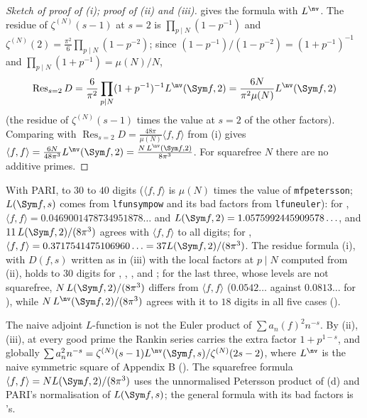 \begin{proof}[Sketch of proof of (i); proof of (ii) and (iii)]
gives the formula with $L^{\nv}$. The residue of $\zeta^{(N)}(s-1)$ at $s=2$ is $\prod_{p\mid N}(1-p^{-1})$ and
$\zeta^{(N)}(2)=\frac{\pi^2}6\prod_{p\mid N}(1-p^{-2})$; since $(1-p^{-1})/(1-p^{-2})=(1+p^{-1})^{-1}$ and $\prod_{p\mid N}(1+p^{-1})=\mu(N)/N$,
\[
\operatorname{Res}_{s=2}D=\frac6{\pi^2}\prod_{p\mid N}(1+p^{-1})^{-1}L^{\nv}(\Sym f,2)=\frac{6N}{\pi^2\mu(N)}L^{\nv}(\Sym f,2)
\]
(the residue of $\zeta^{(N)}(s-1)$ times the value at $s=2$ of the other factors). Comparing with $\operatorname{Res}_{s=2}D=\frac{48\pi}{\mu(N)}\langle f,f\rangle$ from (i)
gives $\langle f,f\rangle=\frac{6N}{48\pi^3}L^{\nv}(\Sym f,2)=\frac{N\,L^{\nv}(\Sym f,2)}{8\pi^3}$. For squarefree $N$ there are no additive primes.
\end{proof}

\begin{example}\label{ex:hecke:rankin-numerics}
With PARI, to $30$ to $40$ digits ($\langle f,f\rangle$ is $\mu(N)$ times the value of \texttt{mfpetersson}; $L(\Sym f,s)$ comes from \texttt{lfunsympow} and its bad factors from
\texttt{lfuneuler}): for ,
$\langle f,f\rangle=0.0469001478734951878\ldots$ and $L(\Sym f,2)=1.0575992445909578\ldots$, and $11\,L(\Sym f,2)/(8\pi^3)$ agrees with $\langle f,f\rangle$ to all digits; for ,
$\langle f,f\rangle=0.3717541475106960\ldots=37L(\Sym f,2)/(8\pi^3)$. The residue formula (i), with $D(f,s)$ written as in (iii) with the local factors at $p\mid N$ computed from (ii), holds to $30$
digits for , , ,  and ; for the last three, whose levels are not squarefree, $N\,L(\Sym f,2)/(8\pi^3)$ differs from $\langle f,f\rangle$
($0.0542\ldots$ against $0.0813\ldots$ for ), while $N\,L^{\nv}(\Sym f,2)/(8\pi^3)$ agrees with it to $18$ digits in all five cases ().
\end{example}

\begin{warning}\label{warn:hecke:rankin}
The naive adjoint $L$-function is not the Euler product of $\sum a_n(f)^2n^{-s}$. By (ii),(iii), at
every good prime the Rankin series carries the extra factor $1+p^{1-s}$, and globally $\sum a_n^2n^{-s}=\zeta^{(N)}(s-1)L^{\nv}(\Sym f,s)/\zeta^{(N)}(2s-2)$, where $L^{\nv}$ is the naive symmetric square of
Appendix B (). The squarefree formula $\langle f,f\rangle=NL(\Sym f,2)/(8\pi^3)$ uses the unnormalised Petersson product of (d) and PARI's
normalisation of $L(\Sym f,s)$; the general formula with its bad factors is 's.
\end{warning}

